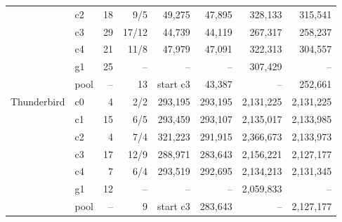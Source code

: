 \begin{longtable}{llrrrrrr}
 & c2 & 18 & 9/5 & 49,275 & 47,895 & 328,133 & 315,541 \\
 & c3 & 29 & 17/12 & 44,739 & 44,119 & 267,317 & 258,237 \\
 & c4 & 21 & 11/8 & 47,979 & 47,091 & 322,313 & 304,557 \\
 & g1 & 25 & -- & -- & -- & 307,429 & -- \\
 & pool & -- & 13 & start c3 & 43,387 & -- & 252,661 \\
\midrule
Thunderbird & c0 & 4 & 2/2 & 293,195 & 293,195 & 2,131,225 & 2,131,225 \\
 & c1 & 15 & 6/5 & 293,459 & 293,107 & 2,135,017 & 2,133,985 \\
 & c2 & 4 & 7/4 & 321,223 & 291,915 & 2,366,673 & 2,133,973 \\
 & c3 & 17 & 12/9 & 288,971 & 283,643 & 2,156,221 & 2,127,177 \\
 & c4 & 7 & 6/4 & 293,519 & 292,695 & 2,134,213 & 2,131,345 \\
 & g1 & 12 & -- & -- & -- & 2,059,833 & -- \\
 & pool & -- & 9 & start c3 & 283,643 & -- & 2,127,177 \\
\bottomrule
\end{longtable}
